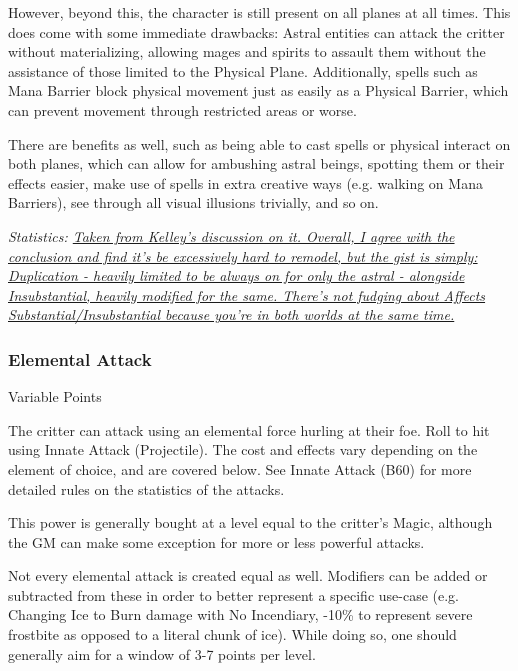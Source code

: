 \begin{multicols*}{3}
	However, beyond this, the character is still present on all planes at all times. This does come with some immediate drawbacks: Astral entities can attack the critter without materializing, allowing mages and spirits to assault them without the assistance of those limited to the Physical Plane. Additionally, spells such as Mana Barrier block physical movement just as easily as a Physical Barrier, which can prevent movement through restricted areas or worse.
	
	There are benefits as well, such as being able to cast spells or physical interact on both planes, which can allow for ambushing astral beings, spotting them or their effects easier, make use of spells in extra creative ways (e.g. walking on Mana Barriers), see through all visual illusions trivially, and so on.

	\textcolor{OliveGreen}{\textit{Statistics: \href{http://forums.sjgames.com/showpost.php?p=507199&postcount=8}{Taken from Kelley's discussion on it. Overall, I agree with the conclusion and find it's be excessively hard to remodel, but the gist is simply: Duplication - heavily limited to be always on for only the astral - alongside Insubstantial, heavily modified for the same. There's not fudging about Affects Substantial/Insubstantial because you're in both worlds at the same time.}}}
	
	\subsubsection{Elemental Attack}\label{elemental_attack}
	\begin{flushright}
		Variable Points
	\end{flushright}
	
	The critter can attack using an elemental force hurling at their foe. Roll to hit using Innate Attack (Projectile). The cost and effects vary depending on the element of choice, and are covered below. See Innate Attack (B60) for more detailed rules on the statistics of the attacks.
	
	This power is generally bought at a level equal to the critter's Magic, although the GM can make some exception for more or less powerful attacks.
	
	Not every elemental attack is created equal as well. Modifiers can be added or subtracted from these in order to better represent a specific use-case (e.g. Changing Ice to Burn damage with No Incendiary, -10\% to represent severe frostbite as opposed to a literal chunk of ice). While doing so, one should generally aim for a window of 3-7 points per level.
	

\end{multicols*}
